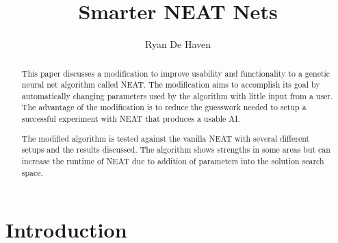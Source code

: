\documentclass[12pt]{ucthesis} \newif\ifpdf \ifx\pdfoutput\undefined
\begin{document}
\title{Smarter NEAT Nets}

\author{Ryan De Haven}
  
 
      


\maketitle

\begin{frontmatter}

\copyrightpage

\approvalpage

 
\begin{abstract}
This paper discusses a modification to improve usability and functionality to a
genetic neural net algorithm called NEAT. The modification aims to accomplish
its goal by automatically changing parameters used by the algorithm with little
input from a user. The advantage of the modification is to reduce the guesswork
needed to setup a successful experiment with NEAT that produces a usable AI.

The modified algorithm is tested against the vanilla NEAT with several different
setups and the results discussed. The algorithm shows strengths in some areas
but can increase the runtime of NEAT due to addition of parameters into the
solution search space.

\end{abstract}

\begin{acknowledgements}

\end{acknowledgements}

\tableofcontents

\listoftables

\listoffigures

\end{frontmatter}

\pagestyle{plain}

\renewcommand{\baselinestretch}{1.66}


\chapter{Introduction}
\end{document}
